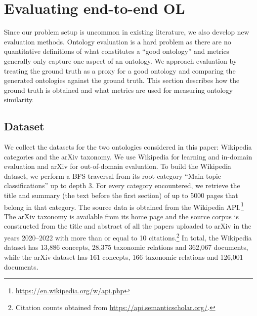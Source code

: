 \documentclass{article}
\begin{document}
\section{Evaluating end-to-end OL}

Since our problem setup is uncommon in existing literature, we also develop new evaluation methods. Ontology evaluation is a hard problem as there are no quantitative definitions of what constitutes a ``good ontology'' and metrics generally only capture one aspect of an ontology. We approach evaluation by treating the ground truth as a proxy for a good ontology and comparing the generated ontologies against the ground truth. This section describes how the ground truth is obtained and what metrics are used for measuring ontology similarity.


\subsection{Dataset}

We collect the datasets for the two ontologies considered in this paper: Wikipedia categories and the arXiv taxonomy. We use Wikipedia for learning and in-domain evaluation and arXiv for out-of-domain evaluation. To build the Wikipedia dataset, we perform a BFS traversal from its root category ``Main topic classifications'' up to depth 3. For every category encountered, we retrieve the title and summary (the text before the first section) of up to 5000 pages that belong in that category. The source data is obtained from the Wikipedia API.\footnote{\url{https://en.wikipedia.org/w/api.php}} The arXiv taxonomy is available from its home page and the source corpus is constructed from the title and abstract of all the papers uploaded to arXiv in the years 2020--2022 with more than or equal to 10 citations.\footnote{Citation counts obtained from \url{https://api.semanticscholar.org/}.} In total, the Wikipedia dataset has 13,886 concepts, 28,375 taxonomic relations and 362,067 documents, while the arXiv dataset has 161 concepts, 166 taxonomic relations and 126,001 documents.
\end{document}
